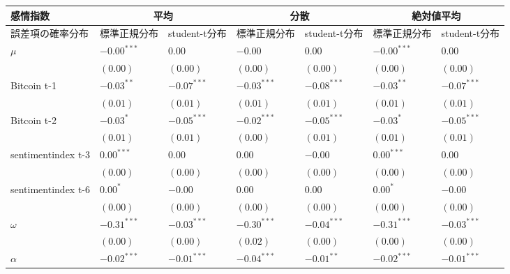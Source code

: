 \begin{landscape}
\begin{table}[]
\begin{tabular}{lllllll}
\hline
感情指数               & \multicolumn{2}{c}{平均}        & \multicolumn{2}{c}{分散}        & \multicolumn{2}{c}{絶対値平均}     \\ \hline
誤差項の確率分布           & 標準正規分布        & student-t分布   & 標準正規分布        & student-t分布   & 標準正規分布        & student-t分布   \\ \hline
$\mu$              & $-0.00^{***}$ & $0.00$        & $-0.00$       & $0.00$        & $-0.00^{***}$ & $0.00$        \\
                   & $(0.00)$      & $(0.00)$      & $(0.00)$      & $(0.00)$      & $(0.00)$      & $(0.00)$      \\
Bitcoin t-1        & $-0.03^{**}$  & $-0.07^{***}$ & $-0.03^{***}$ & $-0.08^{***}$ & $-0.03^{**}$  & $-0.07^{***}$ \\
                   & $(0.01)$      & $(0.01)$      & $(0.01)$      & $(0.01)$      & $(0.01)$      & $(0.01)$      \\
Bitcoin t-2        & $-0.03^{*}$   & $-0.05^{***}$ & $-0.02^{***}$ & $-0.05^{***}$ & $-0.03^{*}$   & $-0.05^{***}$ \\
                   & $(0.01)$      & $(0.01)$      & $(0.00)$      & $(0.01)$      & $(0.01)$      & $(0.01)$      \\
sentimentindex t-3 & $0.00^{***}$  & $0.00$        & $0.00$        & $-0.00$       & $0.00^{***}$  & $0.00$        \\
                   & $(0.00)$      & $(0.00)$      & $(0.00)$      & $(0.00)$      & $(0.00)$      & $(0.00)$      \\
sentimentindex t-6 & $0.00^{*}$    & $-0.00$       & $0.00$        & $0.00$        & $0.00^{*}$    & $-0.00$       \\
                   & $(0.00)$      & $(0.00)$      & $(0.00)$      & $(0.00)$      & $(0.00)$      & $(0.00)$      \\
$\omega$           & $-0.31^{***}$ & $-0.03^{***}$ & $-0.30^{***}$ & $-0.04^{***}$ & $-0.31^{***}$ & $-0.03^{***}$ \\
                   & $(0.00)$      & $(0.00)$      & $(0.02)$      & $(0.00)$      & $(0.00)$      & $(0.00)$      \\
$\alpha$           & $-0.02^{***}$ & $-0.01^{***}$ & $-0.04^{***}$ & $-0.01^{**}$  & $-0.02^{***}$ & $-0.01^{***}$ \\

\end{tabular}
\end{table}
\end{landscape}
